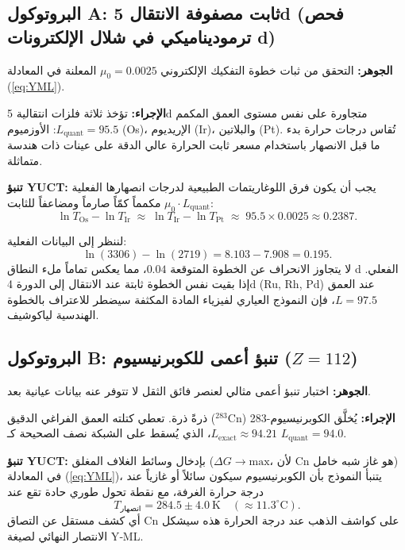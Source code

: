 \documentclass[11pt,a4paper]{article}
\begin{document}
	\subsection{البروتوكول A: ثابت مصفوفة الانتقال 5d (فحص ترموديناميكي في شلال الإلكترونات d)}
	\textbf{الجوهر:} التحقق من ثبات خطوة التفكيك الإلكتروني \(\mu_0 = 0.0025\) المعلنة في المعادلة (\ref{eq:YML}).
	
	\textbf{الإجراء:} تؤخذ ثلاثة فلزات انتقالية 5d متجاورة على نفس مستوى العمق المكمم \(L_{\mathrm{quant}} = 95.5\): الأوزميوم (Os)، الإريديوم (Ir)، والبلاتين (Pt). تُقاس درجات حرارة بدء ما قبل الانصهار باستخدام مسعر ثابت الحرارة عالي الدقة على عينات ذات هندسة متماثلة.
	
	\textbf{تنبؤ YUCT:} يجب أن يكون فرق اللوغاريتمات الطبيعية لدرجات انصهارها الفعلية مكمماً كمّاً صارماً ومضاعفاً للثابت \(\mu_0 \cdot L_{\mathrm{quant}}\):
	\begin{equation}
		\ln T_{\mathrm{Os}} - \ln T_{\mathrm{Ir}} \;\approx\; \ln T_{\mathrm{Ir}} - \ln T_{\mathrm{Pt}} \;\approx\; 95.5 \times 0.0025 \approx 0.2387 .
	\end{equation}
	
	لننظر إلى البيانات الفعلية:
	\[
	\ln(3306) - \ln(2719) = 8.103 - 7.908 = \mathbf{0.195}.
	\]
	لا يتجاوز الانحراف عن الخطوة المتوقعة \(0.04\)، مما يعكس تماماً ملء النطاق d الفعلي. إذا بقيت نفس الخطوة ثابتة عند الانتقال إلى الدورة 4d (Ru, Rh, Pd) عند العمق \(L = 97.5\)، فإن النموذج العياري لفيزياء المادة المكثفة سيضطر للاعتراف بالخطوة الهندسية لياكوشيف.
	
	\subsection{البروتوكول B: تنبؤ أعمى للكوبرنيسيوم (\(Z=112\))}
	\textbf{الجوهر:} اختبار تنبؤ أعمى مثالي لعنصر فائق الثقل لا تتوفر عنه بيانات عيانية بعد.
	
	\textbf{الإجراء:} يُخلَّق الكوبرنيسيوم-283 (\(^{283}\mathrm{Cn}\)) ذرةً ذرة. تعطي كتلته العمق الفراغي الدقيق \(L_{\mathrm{exact}} \approx 94.21\)، الذي يُسقط على الشبكة نصف الصحيحة كـ \(L_{\mathrm{quant}} = 94.0\).
	
	\textbf{تنبؤ YUCT:} بإدخال وسائط الغلاف المغلق (\(\Delta G \to \mathrm{max}\)، لأن Cn هو غاز شبه خامل) في المعادلة (\ref{eq:YML})، يتنبأ النموذج بأن الكوبرنيسيوم سيكون سائلاً أو غازياً عند درجة حرارة الغرفة، مع نقطة تحول طوري حادة تقع عند
	\begin{equation}
		T_{\text{انصهار}} = 284.5 \pm 4.0~\mathrm{K} \quad (\approx 11.3^\circ\mathrm{C}).
	\end{equation}
	أي كشف مستقل عن التصاق Cn على كواشف الذهب عند درجة الحرارة هذه سيشكل الانتصار النهائي لصيغة Y‑ML.
	
\end{document}
